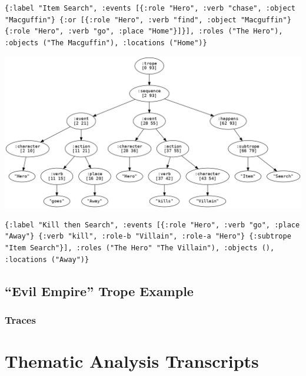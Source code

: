 \documentclass[11pt]{report}
\begin{document}
\begin{lstlisting}[showstringspaces=false]
{:label "Item Search", :events [{:role "Hero", :verb "chase", :object "Macguffin"} {:or [{:role "Hero", :verb "find", :object "Macguffin"} {:role "Hero", :verb "go", :place "Home"}]}], :roles ("The Hero"), :objects ("The Macguffin"), :locations ("Home")}
\end{lstlisting}

\vspace{7mm}
\centerline{\includegraphics[width=\textwidth]{kill-then-search-tree.png}}
\vspace{7mm}

\begin{lstlisting}[showstringspaces=false]
{:label "Kill then Search", :events [{:role "Hero", :verb "go", :place "Away"} {:verb "kill", :role-b "Villain", :role-a "Hero"} {:subtrope "Item Search"}], :roles ("The Hero" "The Villain"), :objects (), :locations ("Away")}
\end{lstlisting}

\section{``Evil Empire'' Trope Example}
\label{appendix:evil-empire}

\subsection{Traces}
\label{appendix:evil-empire-traces}

\chapter{Thematic Analysis Transcripts}
\label{appendix:transcripts}

\def\feature#1{\todo[color=green,size=\scriptsize]{\textbf{Feature:} #1}}
\end{document}
